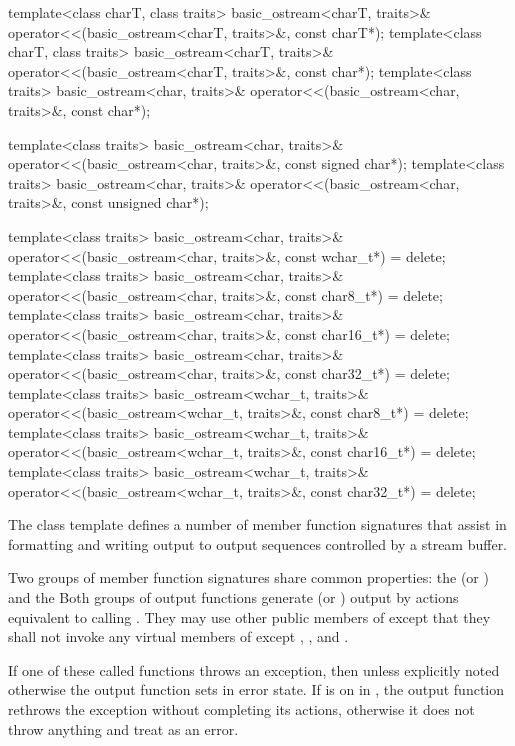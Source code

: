 \begin{codeblock}
{  template<class charT, class traits>
    basic_ostream<charT, traits>& operator<<(basic_ostream<charT, traits>&, const charT*);
  template<class charT, class traits>
    basic_ostream<charT, traits>& operator<<(basic_ostream<charT, traits>&, const char*);
  template<class traits>
    basic_ostream<char, traits>& operator<<(basic_ostream<char, traits>&, const char*);

  template<class traits>
    basic_ostream<char, traits>& operator<<(basic_ostream<char, traits>&, const signed char*);
  template<class traits>
    basic_ostream<char, traits>& operator<<(basic_ostream<char, traits>&, const unsigned char*);

  template<class traits>
    basic_ostream<char, traits>&
      operator<<(basic_ostream<char, traits>&, const wchar_t*) = delete;
  template<class traits>
    basic_ostream<char, traits>&
      operator<<(basic_ostream<char, traits>&, const char8_t*) = delete;
  template<class traits>
    basic_ostream<char, traits>&
      operator<<(basic_ostream<char, traits>&, const char16_t*) = delete;
  template<class traits>
    basic_ostream<char, traits>&
      operator<<(basic_ostream<char, traits>&, const char32_t*) = delete;
  template<class traits>
    basic_ostream<wchar_t, traits>&
      operator<<(basic_ostream<wchar_t, traits>&, const char8_t*) = delete;
  template<class traits>
    basic_ostream<wchar_t, traits>&
      operator<<(basic_ostream<wchar_t, traits>&, const char16_t*) = delete;
  template<class traits>
    basic_ostream<wchar_t, traits>&
      operator<<(basic_ostream<wchar_t, traits>&, const char32_t*) = delete;
}
\end{codeblock}

\pnum
The class template
defines a number of member function
signatures that assist in formatting and writing output to output sequences
controlled by a stream buffer.

\pnum
Two groups of member function signatures share common properties:
the
(or
)
and the
Both groups of output functions generate (or
)
output
by actions equivalent to calling
.
They may use other public members of
except that they shall not invoke any virtual members of
except
,
,
and
.

\pnum
If one of these called functions throws an exception, then unless explicitly noted otherwise
the output function sets
in error state.
If
is on in
,
the output function
rethrows the exception without completing its actions, otherwise
it does not throw anything and treat as an error.

